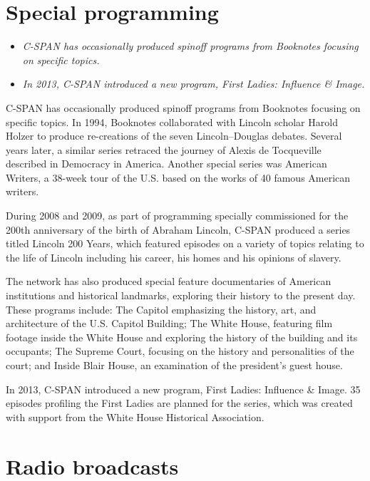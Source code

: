 \section{Special programming}\label{special-programming}

\begin{itemize}
\item
  \emph{C-SPAN has occasionally produced spinoff programs from Booknotes
  focusing on specific topics.}
\item
  \emph{In 2013, C-SPAN introduced a new program, First Ladies:
  Influence \& Image.}
\end{itemize}

C-SPAN has occasionally produced spinoff programs from Booknotes
focusing on specific topics. In 1994, Booknotes collaborated with
Lincoln scholar Harold Holzer to produce re-creations of the seven
Lincoln--Douglas debates. Several years later, a similar series retraced
the journey of Alexis de Tocqueville described in Democracy in America.
Another special series was American Writers, a 38-week tour of the U.S.
based on the works of 40 famous American writers.

During 2008 and 2009, as part of programming specially commissioned for
the 200th anniversary of the birth of Abraham Lincoln, C-SPAN produced a
series titled Lincoln 200 Years, which featured episodes on a variety of
topics relating to the life of Lincoln including his career, his homes
and his opinions of slavery.

The network has also produced special feature documentaries of American
institutions and historical landmarks, exploring their history to the
present day. These programs include: The Capitol emphasizing the
history, art, and architecture of the U.S. Capitol Building; The White
House, featuring film footage inside the White House and exploring the
history of the building and its occupants; The Supreme Court, focusing
on the history and personalities of the court; and Inside Blair House,
an examination of the president's guest house.

In 2013, C-SPAN introduced a new program, First Ladies: Influence \&
Image. 35 episodes profiling the First Ladies are planned for the
series, which was created with support from the White House Historical
Association.

\section{Radio broadcasts}\label{radio-broadcasts}

